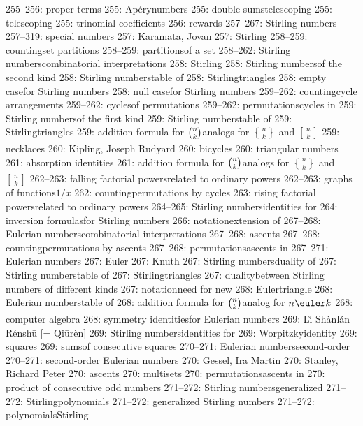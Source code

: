 255--256: proper terms
255: Ap\'ery\sub numbers
255: double sums\sub telescoping
255: telescoping
255: trinomial coefficients
256: rewards
257--267: Stirling numbers
257--319: special numbers
257: Karamata, Jovan
257: Stirling
258--259: counting\sub set partitions
258--259: partitions\sub of a set
258--262: Stirling numbers\sub combinatorial interpretations
258: Stirling
258: Stirling numbers\sub of the second kind
258: Stirling numbers\sub table of
258: Stirling\sub triangles
258: empty case\sub for Stirling numbers
258: null case\sub for Stirling numbers
259--262: counting\sub cycle arrangements
259--262: cycles\sub of permutations
259--262: permutations\sub cycles in
259: Stirling numbers\sub of the first kind
259: Stirling numbers\sub table of
259: Stirling\sub triangles
259: addition formula for ${n\choose k}_{\mathstrut}$\sub analogs for $n\brace k$ and $\,n\,\brack k$
259: necklaces
260: Kipling, Joseph Rudyard
260: bicycles
260: triangular numbers
261: absorption identities
261: addition formula for ${n\choose k}_{\mathstrut}$\sub analogs for $n\brace k$ and $\,n\,\brack k$
262--263: falling factorial powers\sub related to ordinary powers
262--263: graphs of functions\sub $1/x$
262: counting\sub permutations by cycles
263: rising factorial powers\sub related to ordinary powers
264--265: Stirling numbers\sub identities for
264: inversion formulas\sub for Stirling numbers
266: notation\sub extension of
267--268: Eulerian numbers\sub combinatorial interpretations
267--268: ascents
267--268: counting\sub permutations by ascents
267--268: permutations\sub ascents in
267--271: Eulerian numbers
267: Euler
267: Knuth
267: Stirling numbers\sub duality of
267: Stirling numbers\sub table of
267: Stirling\sub triangles
267: duality\sub between Stirling numbers of different kinds
267: notation\sub need for new
268: Euler\sub triangle
268: Eulerian numbers\sub table of
268: addition formula for ${n\choose k}_{\mathstrut}$\sub analog for ${n\euler k}_{\mathstrut}$
268: computer algebra
268: symmetry identities\sub for Eulerian numbers
269: L\u{\i} Sh\`anl\'an R\'ensh\=u [= Qi\=ur\`en]
269: Stirling numbers\sub identities for
269: Worpitzky\sub identity
269: squares
269: sums\sub of consecutive squares
270--271: Eulerian numbers\sub second-order
270--271: second-order Eulerian numbers
270: Gessel, Ira Martin
270: Stanley, Richard Peter
270: ascents
270: multisets
270: permutations\sub ascents in
270: product of consecutive odd numbers
271--272: Stirling numbers\sub generalized
271--272: Stirling\sub polynomials
271--272: generalized Stirling numbers
271--272: polynomials\sub Stirling
